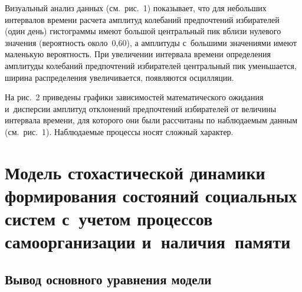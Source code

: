 \begin{multicols}{2}
    Визуальный анализ данных (см.\ рис.~1) показывает, что для небольших 
интервалов времени расчета амплитуд колебаний предпочтений избирателей 
(один день) гистограммы имеют большой центральный пик вблизи нулевого 
значения (вероятность около~0,60), а амплитуды с~большими значениями 
имеют маленькую вероятность. При увеличении интервала времени 
определения амплитуды колебаний предпочтений избирателей центральный 
пик уменьшается, ширина распределения увеличивается, появляются 
осцилляции.
    


    На рис.~2 приведены графики зависимостей математического ожидания 
и~дисперсии амплитуд отклонений предпочтений избирателей от величины 
интервала времени, для которого они были рассчитаны по наблюдаемым 
данным (см.\ рис.~1). Наблю\-да\-емые процессы носят сложный характер. 
    
   
     
\section{Модель стохастической динамики формирования состояний 
социальных систем с~учетом процессов самоорганизации 
и~наличия~памяти} 

\subsection{Вывод основного уравнения модели}
 

\end{multicols}
